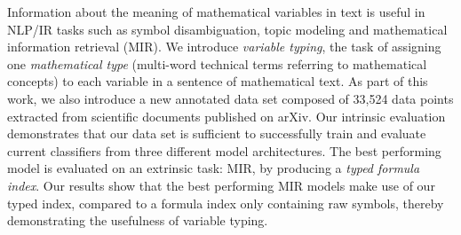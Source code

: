Information about the meaning of mathematical variables in text is useful in NLP/IR tasks such as symbol disambiguation, topic modeling and mathematical information retrieval (MIR). We introduce \emph{variable typing}, the task of assigning one \emph{mathematical type} (multi-word technical terms referring to mathematical concepts) to each variable in a sentence of mathematical text. As part of this work, we also introduce a new annotated data set composed of 33,524 data points extracted from scientific documents published on arXiv. Our intrinsic evaluation demonstrates that our data set is sufficient to successfully train and evaluate current classifiers from three different model architectures. The best performing model is evaluated on an extrinsic task: MIR, by producing a \emph{typed formula index}. Our results show that the best performing MIR models make use of our typed index, compared to a formula index only containing raw symbols, thereby demonstrating the usefulness of variable typing.
